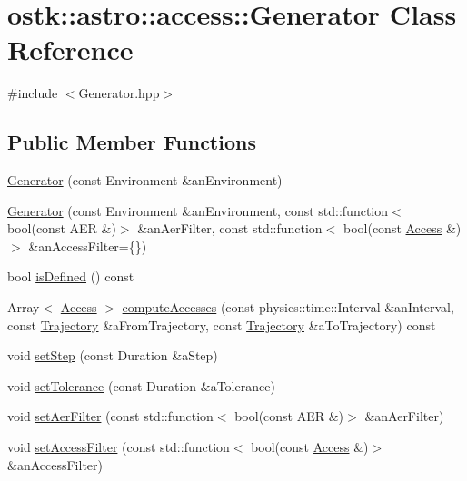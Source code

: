 \hypertarget{classostk_1_1astro_1_1access_1_1_generator}{}\section{ostk\+:\+:astro\+:\+:access\+:\+:Generator Class Reference}
\label{classostk_1_1astro_1_1access_1_1_generator}


{\ttfamily \#include $<$Generator.\+hpp$>$}

\subsection*{Public Member Functions}
\begin{DoxyCompactItemize}
\item 
\hyperlink{classostk_1_1astro_1_1access_1_1_generator_af609f21b3329033836220c55b75ab704}{Generator} (const Environment \&an\+Environment)
\item 
\hyperlink{classostk_1_1astro_1_1access_1_1_generator_a2b7303a186ca8c690c0769c5cae0c91e}{Generator} (const Environment \&an\+Environment, const std\+::function$<$ bool(const A\+ER \&)$>$ \&an\+Aer\+Filter, const std\+::function$<$ bool(const \hyperlink{classostk_1_1astro_1_1_access}{Access} \&)$>$ \&an\+Access\+Filter=\{\})
\item 
bool \hyperlink{classostk_1_1astro_1_1access_1_1_generator_a36d805bcebc2997daa0a1d89f5240277}{is\+Defined} () const
\item 
Array$<$ \hyperlink{classostk_1_1astro_1_1_access}{Access} $>$ \hyperlink{classostk_1_1astro_1_1access_1_1_generator_a3624c39c3ffa4588c40a687ccc4b8145}{compute\+Accesses} (const physics\+::time\+::\+Interval \&an\+Interval, const \hyperlink{classostk_1_1astro_1_1_trajectory}{Trajectory} \&a\+From\+Trajectory, const \hyperlink{classostk_1_1astro_1_1_trajectory}{Trajectory} \&a\+To\+Trajectory) const
\item 
void \hyperlink{classostk_1_1astro_1_1access_1_1_generator_a4c0cb8f1e59364029e88078c423cd96b}{set\+Step} (const Duration \&a\+Step)
\item 
void \hyperlink{classostk_1_1astro_1_1access_1_1_generator_a9590a1ebb05d28f7934f8ccafbd02a60}{set\+Tolerance} (const Duration \&a\+Tolerance)
\item 
void \hyperlink{classostk_1_1astro_1_1access_1_1_generator_a4d82f15eb2da1fbf7c74b3136eed3301}{set\+Aer\+Filter} (const std\+::function$<$ bool(const A\+ER \&)$>$ \&an\+Aer\+Filter)
\item 
void \hyperlink{classostk_1_1astro_1_1access_1_1_generator_ade3c6b8b5afe0f850e3531d715eac826}{set\+Access\+Filter} (const std\+::function$<$ bool(const \hyperlink{classostk_1_1astro_1_1_access}{Access} \&)$>$ \&an\+Access\+Filter)
\end{DoxyCompactItemize}
